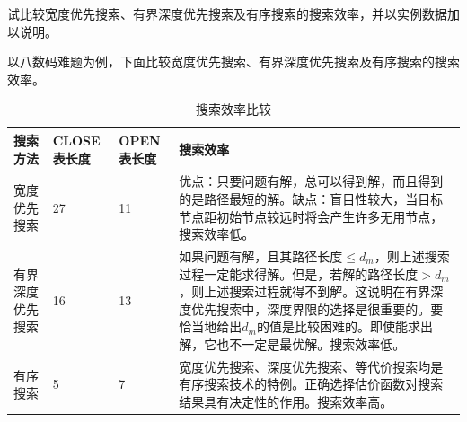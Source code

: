 \begin{question}
试比较宽度优先搜索、有界深度优先搜索及有序搜索的搜索效率，并以实例数据加以说明。
\end{question}
\begin{solution}
以八数码难题为例，下面比较宽度优先搜索、有界深度优先搜索及有序搜索的搜索效率。\par
	\begin{table}[htbp]
	\centering
	\begin{tabular}{p{50pt}p{40pt}p{40pt}p{140pt}}
		\toprule
		搜索方法 & CLOSE表长度 & OPEN表长度 & 搜索效率 \\
		\midrule
		宽度优先搜索 & 27 & 11 &
		优点：只要问题有解，总可以得到解，而且得到的是路径最短的解。\newline 缺点：盲目性较大，当目标节点距初始节点较远时将会产生许多无用节点，搜索效率低。 \\
		\midrule
		有界深度优先搜索 & 16 & 13 &
		如果问题有解，且其路径长度$\leq d_m$，则上述搜索过程一定能求得解。但是，若解的路径长度$>d_m$，则上述搜索过程就得不到解。这说明在有界深度优先搜索中，深度界限的选择是很重要的。要恰当地给出$d_m$的值是比较困难的。即使能求出解，它也不一定是最优解。\newline 搜索效率低。 \\
		\midrule
		有序搜索 & 5 & 7 &
		宽度优先搜索、深度优先搜索、等代价搜索均是有序搜索技术的特例。正确选择估价函数对搜索结果具有决定性的作用。\newline 搜索效率高。\\
		\bottomrule
	\end{tabular}
	\caption{搜索效率比较}\label{tab:comparison-of-searching}
	\end{table} 
\end{solution}

